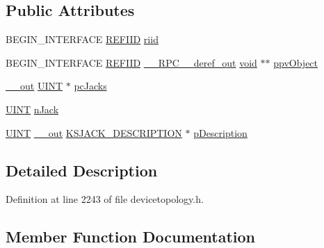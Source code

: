 \subsection*{Public Attributes}
\begin{DoxyCompactItemize}
\item 
B\+E\+G\+I\+N\+\_\+\+I\+N\+T\+E\+R\+F\+A\+CE \hyperlink{px__win__ds_8c_a80ec49c8ae61e234197d5071d2df497d}{R\+E\+F\+I\+ID} \hyperlink{struct_i_ks_jack_description_vtbl_a831468fb23c24f770668644ca4dd708a}{riid}
\item 
B\+E\+G\+I\+N\+\_\+\+I\+N\+T\+E\+R\+F\+A\+CE \hyperlink{px__win__ds_8c_a80ec49c8ae61e234197d5071d2df497d}{R\+E\+F\+I\+ID} \hyperlink{rpcsal_8h_a23bc188526f10656f9c79d950f6c3192}{\+\_\+\+\_\+\+R\+P\+C\+\_\+\+\_\+deref\+\_\+out} \hyperlink{sound_8c_ae35f5844602719cf66324f4de2a658b3}{void} $\ast$$\ast$ \hyperlink{struct_i_ks_jack_description_vtbl_a455ae8a816282031a7a35bf06aa10e05}{ppv\+Object}
\item 
\hyperlink{sal_8h_abb4c3c1135aab6c47cff22e7c16efb74}{\+\_\+\+\_\+out} \hyperlink{mapinls_8h_a36cb3b01d81ffd844bbbfb54003e06ec}{U\+I\+NT} $\ast$ \hyperlink{struct_i_ks_jack_description_vtbl_a4019c34eccc2a12e2ca3e8a79aed7f82}{pc\+Jacks}
\item 
\hyperlink{mapinls_8h_a36cb3b01d81ffd844bbbfb54003e06ec}{U\+I\+NT} \hyperlink{struct_i_ks_jack_description_vtbl_ada3ed1b262f2a2cf83b257e55bddd609}{n\+Jack}
\item 
\hyperlink{mapinls_8h_a36cb3b01d81ffd844bbbfb54003e06ec}{U\+I\+NT} \hyperlink{sal_8h_abb4c3c1135aab6c47cff22e7c16efb74}{\+\_\+\+\_\+out} \hyperlink{struct_k_s_j_a_c_k___d_e_s_c_r_i_p_t_i_o_n}{K\+S\+J\+A\+C\+K\+\_\+\+D\+E\+S\+C\+R\+I\+P\+T\+I\+ON} $\ast$ \hyperlink{struct_i_ks_jack_description_vtbl_ae550a3f5b82987f5b01120f1ebd6333b}{p\+Description}
\end{DoxyCompactItemize}


\subsection{Detailed Description}


Definition at line 2243 of file devicetopology.\+h.



\subsection{Member Function Documentation}
